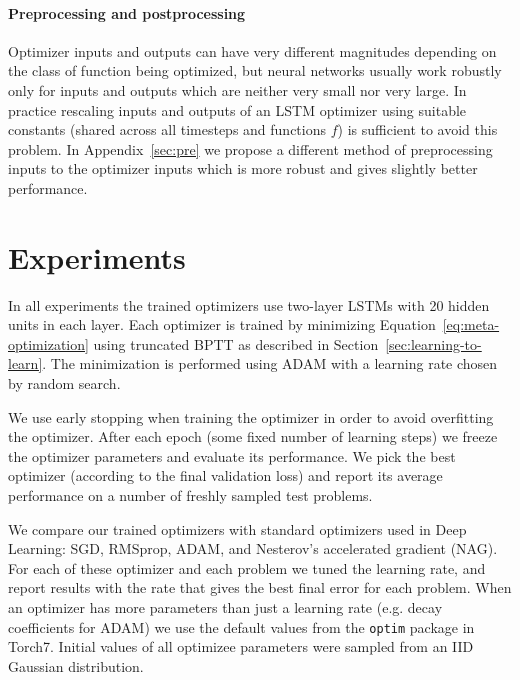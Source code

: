\documentclass{article}
\begin{document}
\paragraph{Preprocessing and postprocessing}

Optimizer inputs and outputs can have very different magnitudes depending on
the class of function being optimized, but neural networks usually work
robustly only for inputs and outputs which are neither very small nor very
large. In practice rescaling inputs and outputs of an LSTM optimizer using
suitable constants (shared across all timesteps and functions $f$) is
sufficient to avoid this problem. In Appendix~\ref{sec:pre} we propose a
different method of preprocessing inputs to the optimizer inputs which is more
robust and gives slightly better performance.





\section{Experiments}\label{sec:exp}

In all experiments the trained optimizers use two-layer LSTMs with 20 hidden
units in each layer. Each optimizer is trained by minimizing
Equation~\ref{eq:meta-optimization} using truncated BPTT as described in
Section~\ref{sec:learning-to-learn}. The minimization is performed using ADAM
with a learning rate chosen by random search.

We use early stopping when training the optimizer in order to avoid overfitting
the optimizer.  After each epoch (some fixed number of learning steps) we
freeze the optimizer parameters and evaluate its performance.  We pick the best
optimizer (according to the final validation loss) and report its average
performance on a number of freshly sampled test problems.

We compare our trained optimizers with standard optimizers used in Deep
Learning: SGD, RMSprop, ADAM, and Nesterov's accelerated gradient (NAG).
For each of these optimizer and each problem we tuned the learning rate, and
report results with the rate that gives the best final error for each problem.
When an optimizer has more parameters than just a learning rate (e.g. decay
coefficients for ADAM) we use the default values from the \texttt{optim}
package in Torch7.  Initial values of all optimizee parameters were sampled
from an IID Gaussian distribution.
\end{document}

